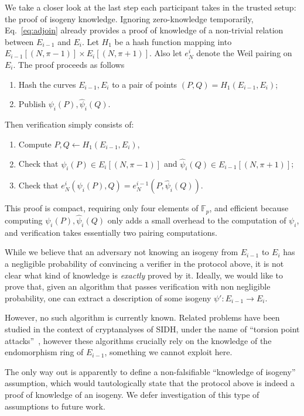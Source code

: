 \documentclass{llncs}
\newcommand{\F}{\mathbb{F}}
\begin{document}
We take a closer look at the last step each participant takes in the
trusted setup: the proof of isogeny knowledge. %
Ignoring zero-knowledge temporarily, Eq.~\eqref{eq:adjoin} already
provides a proof of knowledge of a non-trivial relation between
$E_{i-1}$ and $E_i$. %
Let $H_1$ be a hash function mapping into
$E_{i-1}[(N,\pi-1)] \times E_i[(N,\pi+1)]$.
Also let $e_N^i$ denote the Weil pairing on $E_i$.
The proof proceeds as follows
\begin{enumerate}
\item Hash the curves $E_{i-1},E_i$ to a pair of points
  $(P,Q) = H_1(E_{i-1},E_i)$;
\item Publish $\psi_i(P), \hat\psi_i(Q)$.
\end{enumerate}
Then verification simply consists of:
\begin{enumerate}
\item Compute $P,Q\gets H_1(E_{i-1},E_i)$,
\item Check that $\psi_i(P)\in E_i[(N,\pi-1)]$ and
  $\hat\psi_i(Q)\in E_{i-1}[(N,\pi+1)]$;
\item Check that $e_N^i(\psi_i(P),Q) = e_N^{i-1}(P,\hat\psi_i(Q))$.
\end{enumerate}

This proof is compact, requiring only four elements of $\F_p$, and
efficient because computing $\psi_i(P),\hat\psi_i(Q)$ only adds a
small overhead to the computation of $\psi_i$, and verification takes
essentially two pairing computations. %

\begin{remark}
  While we believe that an adversary not knowing an isogeny from
  $E_{i-1}$ to $E_i$ has a negligible probability of convincing a
  verifier in the protocol above, it is not clear what kind of knowledge
  is \emph{exactly} proved by it. %
  Ideally, we would like to prove that, given an algorithm that passes
  verification with non negligible probability, one can extract a
  description of some isogeny $\psi':E_{i-1}\to E_{i}$. %

  However, no such algorithm is currently known. %
  Related problems have been studied in the context of cryptanalyses
  of SIDH, under the name of ``torsion point
  attacks''~\cite{10.1007/978-3-319-70697-9_12,cryptoeprint:2019:1291,cryptoeprint:2020:633},
  however these algorithms crucially rely on the knowledge of the
  endomorphism ring of $E_{i-1}$, something we cannot exploit here.

  The only way out is apparently to define a non-falsifiable
  ``knowledge of isogeny'' assumption, which would tautologically
  state that the protocol above is indeed a proof of knowledge of an
  isogeny. %
  We defer investigation of this type of assumptions to future work.
\end{remark}
\end{document}
